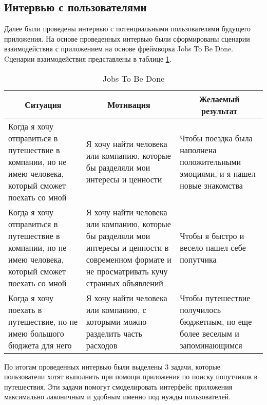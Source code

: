 
\subsection{Интервью с пользователями}

Далее были проведены интервью с потенциальными пользователями будущего приложения. На основе проведенных интервью были сформированы сценарии взаимодействия с приложением на основе фреймворка Jobs To Be Done. Cценарии взаимодействия представлены в таблице \ref{jtbd}.

\begin{table}[H]
    \raggedright
    \caption{Jobs To Be Done}\label{jtbd}
    \begin{tabularx}{\textwidth}{|X|X|X|}
        \hline
        \multicolumn{1}{|c|}{Ситуация} & \multicolumn{1}{c|}{Мотивация} & \multicolumn{1}{c|}{Желаемый результат} \\ \hline
        Когда я хочу отправиться в путешествие в компании, но не имею человека, который сможет поехать со мной &
        Я хочу найти человека или компанию, которые бы разделяли мои интересы и ценности &
        Чтобы поездка была наполнена положительными эмоциями, и я нашел новые знакомства \\ \hline
        Когда я хочу отправиться в путешествие в компании, но не имею человека, который сможет поехать со мной &
        Я хочу найти человека или компанию, которые бы разделяли мои интересы и ценности в современном формате и не просматривать кучу странных объявлений &
        Чтобы я быстро и весело нашел себе попутчика \\ \hline
        Когда я хочу поехать в путешествие, но не имею большого бюджета для него &
        Я хочу найти человека или компанию, с которыми можно разделить часть расходов &
        Чтобы путешествие получилось бюджетным, но еще более веселым и запоминающимся \\ \hline
    \end{tabularx}
\end{table}

По итогам проведенных интервью были выделены 3 задачи, которые пользователи хотят выполнить при помощи приложения по поиску попутчиков в путешествия. Эти задачи помогут смоделировать интерфейс приложения максимально лаконичным и удобным именно под нужды пользователей.

